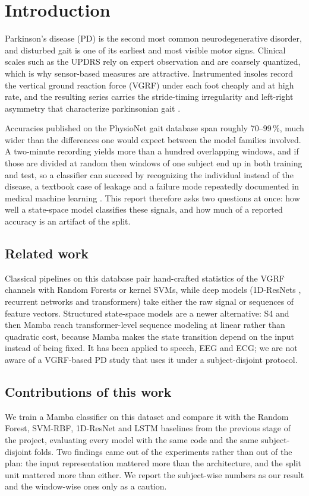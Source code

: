 \section{Introduction}
\label{sec:intro}

Parkinson's disease (PD) is the second most common neurodegenerative disorder,
and disturbed gait is one of its earliest and most visible motor signs. Clinical
scales such as the UPDRS rely on expert observation and are coarsely quantized,
which is why sensor-based measures are attractive. Instrumented insoles record
the vertical ground reaction force (VGRF) under each foot cheaply and at high
rate, and the resulting series carries the stride-timing irregularity and
left-right asymmetry that characterize parkinsonian gait
\cite{hausdorff2007, frenkel2005treadmill}.

Accuracies published on the PhysioNet gait database span roughly 70--99\,\%,
much wider than the differences one would expect between the model families
involved. A two-minute recording yields more than a hundred overlapping
windows, and if those are divided at random then windows of one subject end up
in both training and test, so a classifier can succeed by recognizing the
individual instead of the disease, a textbook case of leakage
\cite{kaufman2012leakage} and a failure mode repeatedly documented in medical
machine learning \cite{varoquaux2022machine}. This report therefore asks two
questions at once: how well a state-space model classifies these signals, and
how much of a reported accuracy is an artifact of the split.

\subsection{Related work}
\label{ssec:sota}
Classical pipelines on this database pair hand-crafted statistics of the VGRF
channels with Random Forests or kernel SVMs, while deep models (1D-ResNets
\cite{he2016resnet}, recurrent networks and transformers) take either the raw
signal or sequences of feature vectors. Structured state-space models are a
newer alternative: S4 \cite{gu2022s4} and then Mamba \cite{gu2023mamba} reach
transformer-level sequence modeling at linear rather than quadratic cost,
because Mamba makes the state transition depend on the input instead of being
fixed. It has been applied to speech, EEG and ECG; we are not aware of a
VGRF-based PD study that uses it under a subject-disjoint protocol.

\subsection{Contributions of this work}
\label{ssec:contr}
We train a Mamba classifier on this dataset and compare it with the Random
Forest, SVM-RBF, 1D-ResNet and LSTM baselines from the previous stage of the
project, evaluating every model with the same code and the same subject-disjoint
folds. Two findings came out of the experiments rather than out of the plan: the
input representation mattered more than the architecture, and the split unit
mattered more than either. We report the subject-wise numbers as our result and
the window-wise ones only as a caution.
